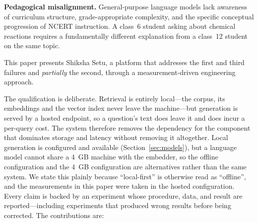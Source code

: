 \documentclass[conference]{IEEEtran}
\begin{document}
\textbf{Pedagogical misalignment.} General-purpose language models lack awareness of curriculum structure, grade-appropriate complexity, and the specific conceptual progression of NCERT instruction. A class~6 student asking about chemical reactions requires a fundamentally different explanation from a class~12 student on the same topic.

This paper presents Shiksha Setu, a platform that addresses the first and third failures and \emph{partially} the second, through a measurement-driven engineering approach.

The qualification is deliberate. Retrieval is entirely local---the corpus, its embeddings and the vector index never leave the machine---but generation is served by a hosted endpoint, so a question's text does leave it and does incur a per-query cost. The system therefore removes the dependency for the component that dominates storage and latency without removing it altogether. Local generation is configured and available (Section~\ref{sec:models}), but a language model cannot share a 4~GB machine with the embedder, so the offline configuration and the 4~GB configuration are alternatives rather than the same system. We state this plainly because ``local-first'' is otherwise read as ``offline'', and the measurements in this paper were taken in the hosted configuration. Every claim is backed by an experiment whose procedure, data, and result are reported---including experiments that produced wrong results before being corrected. The contributions are:
\end{document}

